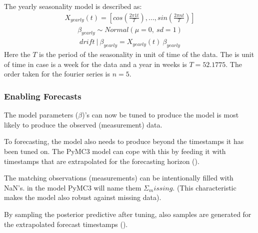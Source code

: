 \documentclass[letterpaper,10pt,english]{sphinxmanual}
\begin{document}
The yearly seasonality model is described as:
\begin{equation*}
\begin{split}X_{yearly}(t) = [cos(\frac{2 \pi 1 t}{T}), ..., sin(\frac{2 \pi n t}{T})]\end{split}
\end{equation*}\begin{equation*}
\begin{split}\beta_{yearly} \sim Normal(\mu=0, \:sd=1)\end{split}
\end{equation*}\begin{equation*}
\begin{split}drift\:|\:\beta_{yearly} = X_{yearly}(t)\:\beta_{yearly}\end{split}
\end{equation*}
Here the \(T\) is the period of the seasonality in unit of time of the data.
The is unit of time in case is a week for the data and a year in weeks is \(T=52.1775\).
The order taken for the fourier series is \(n=5\).


\subsubsection{Enabling Forecasts}
\label{\detokenize{modeling:enabling-forecasts}}
The model parameters (\(\beta\))’s can now be tuned to produce the model is most likely to produce the observed (measurement) data.

To forecasting, the model also needs to produce beyond the timestamps it has been tuned on.
The PyMC3 model can cope with this by feeding it with timestamps that are extrapolated for the forecasting horizon ({\hyperref[\detokenize{autoapi/src/preprocess/preprocess/index:src.preprocess.preprocess.extrapolate_timestamps}]{}}).

The matching observations (measurements) can be intentionally filled with NaN’s. in the model PyMC3 will name them \(\Sigma_missing\).
(This characteristic makes the model also robust against missing data).

By sampling the posterior predictive after tuning, also samples are generated for the extrapolated forecast timestamps ({\hyperref[\detokenize{autoapi/src/forecast/forecast/index:src.forecast.forecast.determine_estimates}]{}}).
\end{document}
